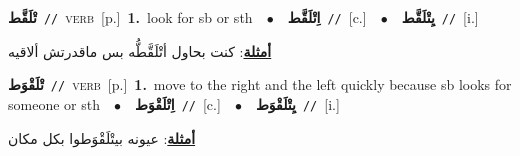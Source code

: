\documentclass[10pt,a4paper,twoside]{article} %
\begin{document}
\begin{multicols}{2}
{\setlength\topsep{0pt}\textbf{\foreignlanguage{arabic}{تْلَقَّط}}\ {\color{gray}\texttt{//}\color{black}}\ \textsc{verb}\ [p.]\ \textbf{1.}~look for sb or sth\ \ $\bullet$\ \ \setlength\topsep{0pt}\textbf{\foreignlanguage{arabic}{اِتْلَقَّط}}\ {\color{gray}\texttt{//}\color{black}}\ [c.]\ \ $\bullet$\ \ \setlength\topsep{0pt}\textbf{\foreignlanguage{arabic}{يِتْلَقَّط}}\ {\color{gray}\texttt{//}\color{black}}\ [i.]\  \begin{flushright}\color{gray}\foreignlanguage{arabic}{\textbf{\underline{\foreignlanguage{arabic}{أمثلة}}}: كنت بحاول أتْلَقَّطُّه بس ماقدرتش ألاقيه}\end{flushright}\color{black}} \vspace{2mm}

{\setlength\topsep{0pt}\textbf{\foreignlanguage{arabic}{تْلَقْوَط}}\ {\color{gray}\texttt{//}\color{black}}\ \textsc{verb}\ [p.]\ \textbf{1.}~move to the right and the left quickly because sb looks for someone or sth\ \ $\bullet$\ \ \setlength\topsep{0pt}\textbf{\foreignlanguage{arabic}{اِتْلَقْوَط}}\ {\color{gray}\texttt{//}\color{black}}\ [c.]\ \ $\bullet$\ \ \setlength\topsep{0pt}\textbf{\foreignlanguage{arabic}{يِتْلَقْوَط}}\ {\color{gray}\texttt{//}\color{black}}\ [i.]\  \begin{flushright}\color{gray}\foreignlanguage{arabic}{\textbf{\underline{\foreignlanguage{arabic}{أمثلة}}}: عيونه بيتْلَقْوَطوا بكل مكان}\end{flushright}\color{black}} \vspace{2mm}


\end{multicols}
\end{document}
